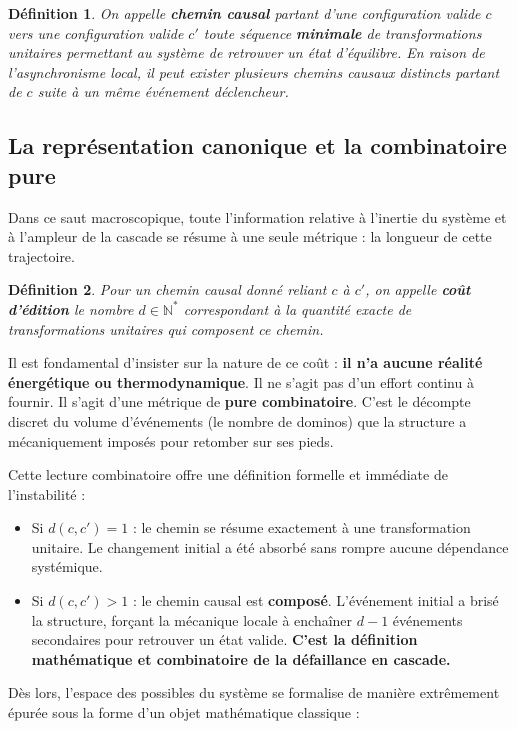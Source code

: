 \documentclass{report}
\newtheorem{definition}{Définition}[section]
\begin{document}
\begin{definition}
	On appelle \textbf{chemin causal} partant d'une configuration valide $c$ vers une configuration valide $c'$ toute séquence \textbf{minimale} de transformations unitaires permettant au système de retrouver un état d'équilibre. En raison de l'asynchronisme local, il peut exister plusieurs chemins causaux distincts partant de $c$ suite à un même événement déclencheur.
\end{definition}

\subsection{La représentation canonique et la combinatoire pure}

Dans ce saut macroscopique, toute l'information relative à l'inertie du système et à l'ampleur de la cascade se résume à une seule métrique : la longueur de cette trajectoire.

\begin{definition}
	Pour un chemin causal donné reliant $c$ à $c'$, on appelle \textbf{coût d'édition} le nombre $d \in \mathbb{N}^*$ correspondant à la quantité exacte de transformations unitaires qui composent ce chemin.
\end{definition}

Il est fondamental d'insister sur la nature de ce coût : \textbf{il n'a aucune réalité énergétique ou thermodynamique}. Il ne s'agit pas d'un \og{}effort\fg{} continu à fournir. Il s'agit d'une métrique de \textbf{pure combinatoire}. C'est le décompte discret du volume d'événements (le nombre de \og{}dominos\fg{}) que la structure a mécaniquement imposés pour retomber sur ses pieds.

Cette lecture combinatoire offre une définition formelle et immédiate de l'instabilité :
\begin{itemize}
	\item Si $d(c, c') = 1$ : le chemin se résume exactement à une transformation unitaire. Le changement initial a été absorbé sans rompre aucune dépendance systémique.
	\item Si $d(c, c') > 1$ : le chemin causal est \textbf{composé}. L'événement initial a brisé la structure, forçant la mécanique locale à enchaîner $d-1$ événements secondaires pour retrouver un état valide. \textbf{C'est la définition mathématique et combinatoire de la défaillance en cascade.}
\end{itemize}

Dès lors, l'espace des possibles du système se formalise de manière extrêmement épurée sous la forme d'un objet mathématique classique :
\end{document}
